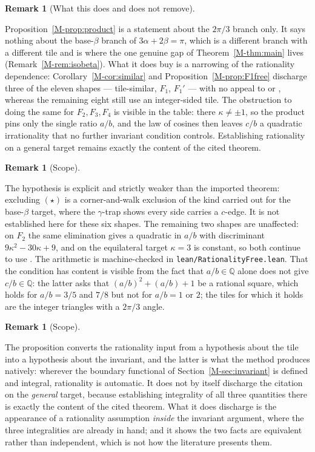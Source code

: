 \documentclass[11pt,reqno]{amsart}
\theoremstyle{plain}
\theoremstyle{definition}
\newtheorem{remark}[theorem]{Remark}
\newcommand{\Q}{\mathbb{Q}}
\begin{document}
\begin{remark}[What this does and does not remove]\label{OM-productscope}

Proposition~\ref{M-prop:product} is a statement about the $2\pi/3$ branch only. It says nothing about
the base-$\beta$ branch of $3\alpha+2\beta=\pi$, which is a different branch with a different tile
and is where the one genuine gap of Theorem~\ref{M-thm:main} lives (Remark~\ref{M-rem:isobeta}). What it
does buy is a narrowing of the rationality dependence: Corollary~\ref{M-cor:similar} and
Proposition~\ref{M-prop:F1free} discharge three of the eleven shapes --- tile-similar, $F_1$, $F_1'$
--- with no appeal to \cite{BeesonZhang} or \cite[Thm.~12.5]{BeesonIso}, whereas the remaining eight
still use an integer-sided tile. The obstruction to doing the same for $F_2,F_3,F_4$ is visible in
the table: there $\kappa\ne\pm1$, so the product pins only the single ratio $a/b$, and the law of
cosines then leaves $c/b$ a quadratic irrationality that no further invariant condition controls.
Establishing rationality on a general target remains exactly the content of the cited theorem.
\end{remark}

\begin{remark}[Scope]\label{OM-ratfreescope}

The hypothesis is explicit and strictly weaker than the imported theorem: excluding $(\star)$ is a
corner-and-walk exclusion of the kind carried out for the base-$\beta$ target, where the
$\gamma$-trap shows every side carries a $c$-edge. It is not established here for these six shapes.
The remaining two shapes are unaffected: on $F_2$ the same elimination gives a quadratic in $a/b$
with discriminant $9\kappa^2-30\kappa+9$, and on the equilateral target $\kappa=3$ is constant, so
both continue to use \cite{BeesonZhang}. The arithmetic is machine-checked in
\texttt{lean/RationalityFree.lean}. That the condition has content is visible from the fact that
$a/b\in\Q$ alone does not give $c/b\in\Q$: the latter asks that $(a/b)^2+(a/b)+1$ be a rational
square, which holds for $a/b=3/5$ and $7/8$ but not for $a/b=1$ or $2$; the tiles for which it holds
are the integer triangles with a $2\pi/3$ angle.
\end{remark}

\begin{remark}[Scope]\label{OM-rationality}

The proposition converts the rationality input from a hypothesis about the tile into a hypothesis
about the invariant, and the latter is what the method produces natively: wherever the boundary
functional of Section~\ref{M-sec:invariant} is defined and integral, rationality is automatic. It does
not by itself discharge the citation on the \emph{general} target, because establishing integrality
of all three quantities there is exactly the content of the cited theorem. What it does discharge is
the appearance of a rationality assumption \emph{inside} the invariant argument, where the three
integralities are already in hand; and it shows the two facts are equivalent rather than
independent, which is not how the literature presents them.
\end{remark}
\end{document}
